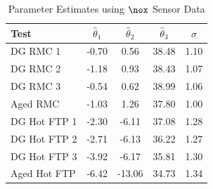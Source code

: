 \begin{table}[ht]
        \centering
        \caption{Parameter Estimates using $\nox$ Sensor Data}
        \label{tab::parm_nox}
        \begin{tabular}{l c c c c}
                \hline \hline
                Test         & $\hat \theta_1 $ & $\hat \theta_2 $ & $\hat \theta_3 $ & $\sigma$ \\ \hline \hline
                DG RMC 1     & -0.70            & 0.56             & 38.48            & 1.10     \\
                DG RMC 2     & -1.18            & 0.93             & 38.43            & 1.07     \\
                DG RMC 3     & -0.54            & 0.62             & 38.99            & 1.06     \\
                Aged RMC     & -1.03            & 1.26             & 37.80            & 1.00     \\ \hline
                DG Hot FTP 1 & -2.30            & -6.11            & 37.08            & 1.28     \\
                DG Hot FTP 2 & -2.71            & -6.13            & 36.22            & 1.27     \\
                DG Hot FTP 3 & -3.92            & -6.17            & 35.81            & 1.30     \\
                Aged Hot FTP & -6.42            & -13.06           & 34.73            & 1.34     \\
                \hline\hline
        \end{tabular}
\end{table}
